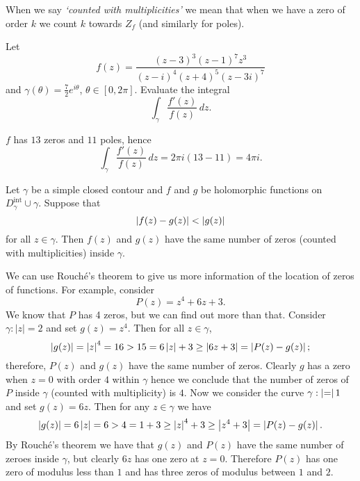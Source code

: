 \begin{remark}
    When we say \emph{`counted with multiplicities'} 
    we mean that when we have a zero of order $k$ we count $k$ towards $Z_f$
    (and similarly for poles).
\end{remark}

\begin{example}
    Let
    \[
        f(z) = \frac{(z-3)^3(z-1)^7z^3}{(z-i)^4(z+4)^5(z-3i)^7}
    \]
    and $\gamma(\theta) = \frac72 e^{i\theta}$, $\theta \in [0, 2\pi]$.
    Evaluate the integral
    \[
        \int_{\gamma} \frac{f'(z)}{f(z)} \,dz.
    \]
\end{example}

\begin{solution}
    $f$ has $13$ zeros and $11$ poles, hence
    \[
        \int_\gamma \frac{f'(z)}{f(z)} \,dz = 2\pi i (13 - 11) = 4\pi i.
    \]
\end{solution}

\begin{theorem}[Rouch\'e's]
    Let $\gamma$ be a simple closed contour
    and $f$ and $g$ be holomorphic functions on $D_\gamma^\text{int} \cup \gamma$.
    Suppose that
    \[
        \left\lvert f(z) - g(z)\right\rvert < \left\lvert g(z)\right\rvert
    \]
    for all $z \in \gamma$.
    Then $f(z)$ and $g(z)$ have the same number of zeros
    (counted with multiplicities) inside $\gamma$.
\end{theorem}

\begin{example}
    We can use Rouch\'e's theorem to give us more information of the location
    of zeros of functions.
    For example, consider
    \[
        P(z) = z^4 + 6z + 3.
    \]
    We know that $P$ has 4 zeros, but we can find out more than that.
    Consider $\gamma: \lvert z \rvert = 2$ and set $g(z) = z^4$.
    Then for all $z \in \gamma$,
    \[
        \left\lvert g(z)\right\rvert 
        = \left\lvert z\right\rvert^4 
        = 16 > 15 
        = 6 \left\lvert z\right\rvert + 3 \geq \left\lvert6z + 3\right\rvert 
        = \left\lvert P(z) - g(z)\right\rvert;
    \]
    therefore, $P(z)$ and $g(z)$ have the same number of zeros.
    Clearly $g$ has a zero when $z = 0$ with order $4$ within $\gamma$
    hence we conclude that the number of zeros of $P$ inside $\gamma$ 
    (counted with multiplicity)
    is $4$.
    Now we consider the curve $\gamma: \left\lvert=\right\rvert 1$ and set $g(z) = 6z$. 
    Then for any $z \in \gamma$ we have
    \[
        \left\lvert g(z)\right\rvert
        = 6\left\lvert z\right\rvert
        = 6 > 4
        = 1 + 3
        \geq \left\lvert z\right\rvert^4 + 3
        \geq \left\lvert z^4 + 3\right\rvert
        = \left\lvert P(z) - g(z)\right\rvert.
    \]
    By Rouch\'e's theorem we have that $g(z)$ and $P(z)$ have the same
    number of zeroes inside $\gamma$,
    but clearly $6z$ has one zero at $z = 0$.
    Therefore $P(z)$ has one zero of modulus less than $1$ and has three zeros
    of modulus between $1$ and $2$.
\end{example}

